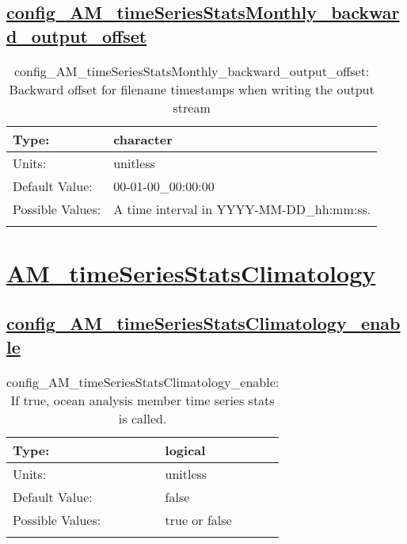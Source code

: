 \subsection[config\_AM\_timeSeriesStatsMonthly\_backward\_output\_offset]{\hyperref[sec:nm_tab_AM_timeSeriesStatsMonthly]{config\_AM\_timeSeriesStatsMonthly\_backward\_output\_offset}}
\label{subsec:nm_sec_config_AM_timeSeriesStatsMonthly_backward_output_offset}
\begin{center}
\begin{longtable}{| p{2.0in} || p{4.0in} |}
    \hline
    Type: & character \\
    \hline
    Units: & \si{unitless} \\
    \hline
    Default Value: & 00-01-00\_00:00:00 \\
    \hline
    Possible Values: & A time interval in YYYY-MM-DD\_hh:mm:ss. \\
    \hline
    \caption{config\_AM\_timeSeriesStatsMonthly\_backward\_output\_offset: Backward offset for filename timestamps when writing the output stream}
\end{longtable}
\end{center}
\section[AM\_timeSeriesStatsClimatology]{\hyperref[sec:nm_tab_AM_timeSeriesStatsClimatology]{AM\_timeSeriesStatsClimatology}}
\label{sec:nm_sec_AM_timeSeriesStatsClimatology}
\subsection[config\_AM\_timeSeriesStatsClimatology\_enable]{\hyperref[sec:nm_tab_AM_timeSeriesStatsClimatology]{config\_AM\_timeSeriesStatsClimatology\_enable}}
\label{subsec:nm_sec_config_AM_timeSeriesStatsClimatology_enable}
\begin{center}
\begin{longtable}{| p{2.0in} || p{4.0in} |}
    \hline
    Type: & logical \\
    \hline
    Units: & \si{unitless} \\
    \hline
    Default Value: & false \\
    \hline
    Possible Values: & true or false \\
    \hline
    \caption{config\_AM\_timeSeriesStatsClimatology\_enable: If true, ocean analysis member time series stats is called.}
\end{longtable}
\end{center}
